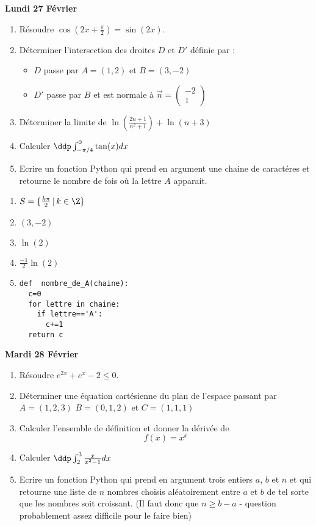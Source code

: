 \documentclass[a4paper, 11pt,reqno]{article}
\newcommand\vv[1]{\overrightarrow{#1}}
\begin{document}
\newpage
\vspace{0.3cm}
\begin{center}
\textbf{Lundi 27 Février }
\end{center}
\begin{enumerate}
\item Résoudre $\cos(2x+\frac{\pi}{2}) =\sin(2x)$.
\item Déterminer  l'intersection des droites  $D$ et $D'$ définie par :
\begin{itemize}
\item $D$ passe par $A=(1,2) $ et $B=(3,-2)$
\item $D'$ passe par $B$ et est normale à $\vv{n}= \begin{pmatrix}
-2\\
1
\end{pmatrix}$ 
\end{itemize}
\item Déterminer la limite de $\ln(\frac{2n+1}{n^2+1})+\ln(n+3)$
\item Calculer $\ddp \int_{-\pi/4}^0 \tan(x)
dx$

\item Ecrire un fonction Python qui prend en argument une chaine de caractéres et retourne le nombre de fois où la lettre $A$ apparait. 
\end{enumerate}

\begin{correction}
\begin{enumerate}
\item $S=\{ \frac{k \pi}{2}\, |\, k\in \Z\}$
\item $(3,-2)$
\item $\ln(2)$
\item $\frac{-1}{2}\ln(2)$
\item 
\begin{lstlisting}
def  nombre_de_A(chaine):
  c=0
  for lettre in chaine:
    if lettre=='A':
      c+=1
  return c
\end{lstlisting}
\end{enumerate}

\end{correction}
\newpage


\begin{center}
\textbf{Mardi 28 Février }
\end{center}

\begin{enumerate}
\item Résoudre $e^{2x} +e^x-2\leq 0$.
\item Déterminer une équation cartésienne du plan de l'espace passant par $A=(1,2,3)$ $B=(0,1,2)$ et $C=(1,1,1)$
\item Calculer l'ensemble de définition et donner la dérivée de $$f(x) =x^x$$
\item Calculer $\ddp \int_{2}^3 \frac{x}{x^2-1}dx$
\item Ecrire un fonction Python qui prend en argument  trois entiers $a$, $b$ et $n$  et qui retourne une liste de $n$ nombres choisis aléatoirement entre $a$ et $b$ de tel sorte que les nombres soit croissant. (Il faut donc  que $n\geq b-a$ - question probablement assez difficile pour le faire bien) 
\end{enumerate}
\end{document}
